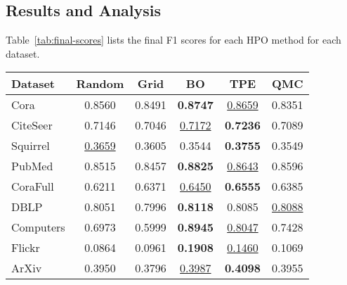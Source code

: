 \subsection{Results and Analysis}
Table~\ref{tab:final-scores} lists the final F1 scores for each HPO method for each dataset.

\begin{table*}
	\caption{Final F1 scores for each HPO method and for each dataset, averaged over 10 independent runs. The best method is \textbf{bold} and the second best is \underline{underlined}.}
	\label{tab:final-scores}
	\centering
	\begin{tabular}{lccccc}
		\toprule
		\textbf{Dataset} & \textbf{Random}    & \textbf{Grid} & \textbf{BO}        & \textbf{TPE}       & \textbf{QMC}       \\
		\midrule
		Cora             & 0.8560             & 0.8491        & \textbf{0.8747}    & \underline{0.8659} & 0.8351             \\
		CiteSeer         & 0.7146             & 0.7046        & \underline{0.7172} & \textbf{0.7236}    & 0.7089             \\
		Squirrel         & \underline{0.3659} & 0.3605        & 0.3544             & \textbf{0.3755}    & 0.3549             \\
		PubMed           & 0.8515             & 0.8457        & \textbf{0.8825}    & \underline{0.8643} & 0.8596             \\
		CoraFull         & 0.6211             & 0.6371        & \underline{0.6450} & \textbf{0.6555}    & 0.6385             \\
		DBLP             & 0.8051             & 0.7996        & \textbf{0.8118}    & 0.8085             & \underline{0.8088} \\
		Computers        & 0.6973             & 0.5999        & \textbf{0.8945}    & \underline{0.8047} & 0.7428             \\
		Flickr           & 0.0864             & 0.0961        & \textbf{0.1908}    & \underline{0.1460} & 0.1069             \\
		ArXiv            & 0.3950             & 0.3796        & \underline{0.3987} & \textbf{0.4098}    & 0.3955             \\
		\bottomrule
	\end{tabular}
\end{table*}

